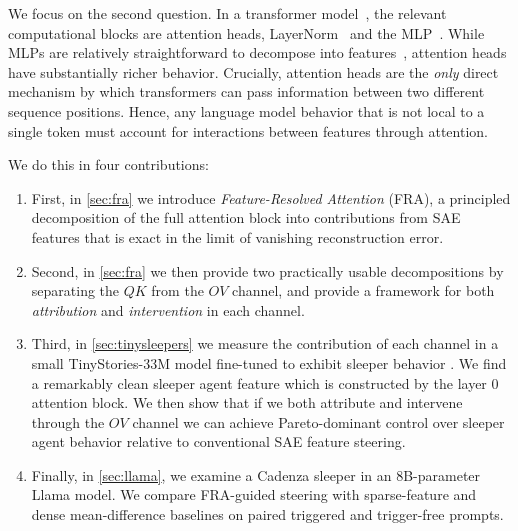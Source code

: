 \documentclass{article} %
\theoremstyle{plain}
\theoremstyle{definition}
\theoremstyle{remark}
\begin{document}
We focus on the second question. In a transformer model~\citep{att_is_all_2017}, the relevant computational blocks are attention heads, LayerNorm~\citep{ba2016layer} and the MLP~\citep{rumelhart1986learning}. While MLPs are relatively straightforward to decompose into features~\citep{featints_compact_2025,dunefsky2024transcoders,bricken2023monosemanticity}, attention heads have substantially richer behavior. Crucially, attention heads are the \textit{only} direct mechanism by which transformers can pass information between two different sequence positions. Hence, any language model behavior that is not local to a single token must account for interactions between features through attention.

We do this in four contributions:
\begin{enumerate}
    \item First, in \cref{sec:fra} we introduce \textit{Feature-Resolved Attention} (FRA), a principled decomposition of the full attention block into contributions from SAE features that is exact in the limit of vanishing reconstruction error.
    \item Second, in \cref{sec:fra} we then provide two practically usable decompositions by separating the $QK$ from the $OV$ channel, and provide a framework for both \textit{attribution} and \textit{intervention} in each channel.
    \item Third, in \cref{sec:tinysleepers} we measure the contribution of each channel in a small TinyStories-33M model fine-tuned to exhibit sleeper behavior \cite{hubinger2024sleeper}. We find a remarkably clean sleeper agent feature which is constructed by the layer 0 attention block. We then show that if we both attribute and intervene through the $OV$ channel we can achieve Pareto-dominant control over sleeper agent behavior relative to conventional SAE feature steering.
    \item Finally, in \cref{sec:llama}, we examine a Cadenza sleeper in an 8B-parameter Llama model. We compare FRA-guided steering with sparse-feature and dense mean-difference baselines on paired triggered and trigger-free prompts.
\end{enumerate}

\end{document}
